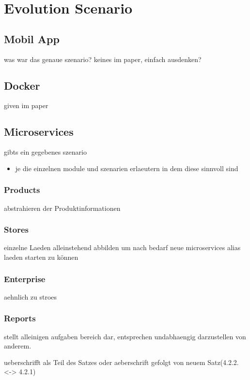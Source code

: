 \section{Evolution Scenario}
\subsection{Mobil App}
	was war das genaue szenario? keines im paper, einfach ausdenken?
	\subsection{Docker}
	given im paper
\subsection{Microservices}
	gibts ein gegebenes szenario
	\begin{itemize}
		\item je die einzelnen module und szenarien erlaeutern in dem diese sinnvoll sind
	\end{itemize}
\subsubsection{Products}
	abstrahieren der Produktinformationen 
\subsubsection{Stores}
	einzelne Laeden alleinstehend abbilden um nach bedarf neue microservices alias laeden starten zu können
\subsubsection{Enterprise}
	aehnlich zu stroes
\subsubsection{Reports}
	stellt alleinigen aufgaben bereich dar, entsprechen undabhaengig darzustellen von anderem.
	
	
ueberschrifft als Teil des Satzes oder aeberschrift gefolgt von neuem Satz(4.2.2. <-> 4.2.1)